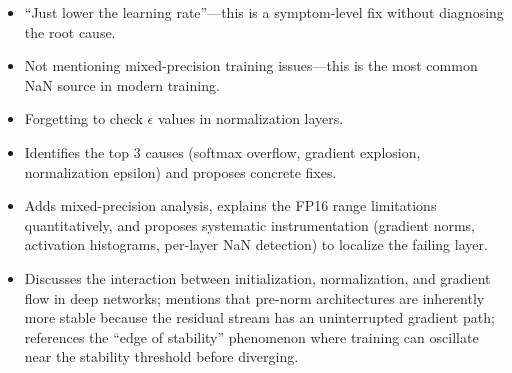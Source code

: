 \begin{interviewq}
\redflags
\begin{itemize}
    \item ``Just lower the learning rate''---this is a symptom-level fix without diagnosing the root cause.
    \item Not mentioning mixed-precision training issues---this is the most common NaN source in modern training.
    \item Forgetting to check $\epsilon$ values in normalization layers.
\end{itemize}


\goodgreat
\begin{itemize}
    \item {} Identifies the top 3 causes (softmax overflow, gradient explosion, normalization epsilon) and proposes concrete fixes.
    \item {} Adds mixed-precision analysis, explains the FP16 range limitations quantitatively, and proposes systematic instrumentation (gradient norms, activation histograms, per-layer NaN detection) to localize the failing layer.
    \item {} Discusses the interaction between initialization, normalization, and gradient flow in deep networks; mentions that pre-norm architectures are inherently more stable because the residual stream has an uninterrupted gradient path; references the ``edge of stability'' phenomenon where training can oscillate near the stability threshold before diverging.
\end{itemize}

\end{interviewq}


